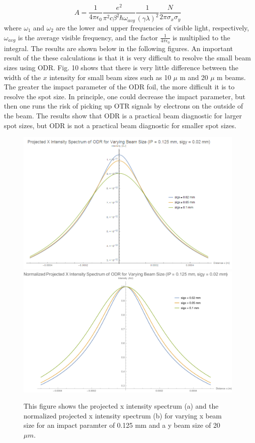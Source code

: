 \documentclass[12pt]{article}
\begin{document}
\begin{equation}
A=\frac{1}{4 \pi \epsilon_0} \frac{e^2}{\pi^2 c \beta^2 \hbar \omega_{avg}} \frac{1}{(\gamma \lambda)^2} \frac{N}{2 \pi \sigma_x \sigma_y}
\end{equation}
where $\omega_1$ and $\omega_2$ are the lower and upper frequencies of visible light, respectively, $\omega_{avg}$ is the average visible frequency, and the factor $\frac{1}{4 \pi \epsilon_0}$ is multiplied to the integral. The results are shown below in the following figures. An important result of the these calculations is that it is very difficult to resolve the small beam sizes using ODR. Fig. 10 shows that there is very little difference between the width of the $x$ intensity for small beam sizes such as 10 $\mu$ m and 20 $\mu$ m beams. The greater the impact parameter of the ODR foil, the more difficult it is to resolve the spot size. In principle, one could decrease the impact parameter, but then one runs the risk of picking up OTR signals by electrons on the outside of the beam. The results show that ODR is a practical beam diagnostic for larger spot sizes, but ODR is not a practical beam diagnostic for smaller spot sizes.

\begin{figure}
\begin{center}
\includegraphics[scale=0.75]{figures/ODR_ProjY_IntensityX.PNG}
\includegraphics[scale=0.5]{figures/ODR_ProjY_Norm_IntensityX.PDF}
\caption{This figure shows the projected x intensity spectrum (a) and the normalized projected x intensity spectrum (b) for varying x beam size for an impact paramter of 0.125 mm and a y beam size of 20 $\mu m$.}
\end{center}
\end{figure}
\end{document}
